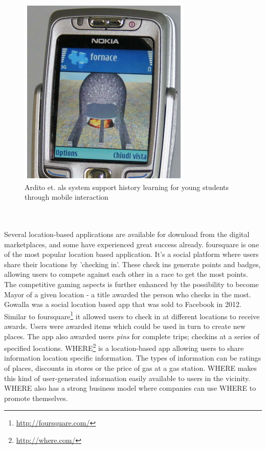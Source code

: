 \begin{figure}
	\centering
	\includegraphics[scale=0.6]{fig/ardito}
	\caption{Ardito et. als \cite{4351331} system support history learning for young students through mobile interaction}
	\label{fig:ardito}
\end{figure}

\\\\
\noindent Several location-based applications are available for download from the digital marketplaces, and some have experienced great success already. foursquare is one of the most popular location based application. It's a social platform where users share their locations by 'checking in'. These check ins generate points and badges, allowing users to compete against each other in a race to get the most points. The competitive gaming aspects is further enhanced by the possibility to become Mayor of a given location - a title awarded the person who checks in the most. Gowalla was a social location based app that was sold to Facebook in 2012. Similar to foursquare\footnote{\url{http://foursquare.com/}} it allowed users to check in at different locations to receive awards. Users were awarded items which could be used in turn to create new places. The app also awarded users \emph{pins} for complete trips; checkins at a series of specified locations. WHERE\footnote{\url{http://where.com/}} is a location-based app allowing users to share information location specific information. The types of information can be ratings of places, discounts in stores or the price of gas at a gas station. WHERE makes this kind of user-generated information easily available to users in the vicinity. WHERE also has a strong business model where companies can use WHERE to promote themselves. 

